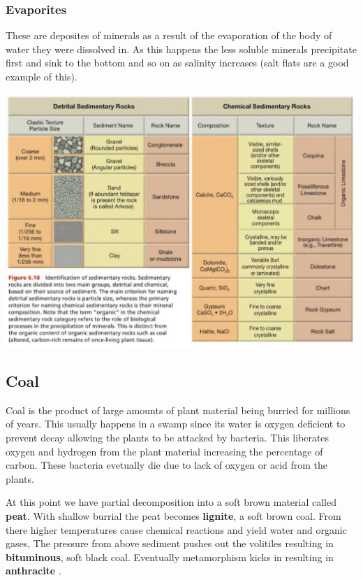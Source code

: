 \documentclass{article}
\begin{document}
\subsubsection{Evaporites} %
\label{sub:evaporites}
These are deposites of minerals as a result of the evaporation of the body of water they were dissolved in. As this happens the less soluble minerals precipitate first and sink to the bottom and so on as salinity increases (salt flats are a good example of this).

\includegraphics[width=7in]{sedimentary}

\subsection{Coal} %
\label{sub:coal}
Coal is the product of large amounts of plant material being burried for millions of years. This usually happens in a swamp since its water is oxygen deficient to prevent decay allowing the plants to be attacked by bacteria. This liberates oxygen and hydrogen from the plant material increasing the percentage of carbon. These bacteria evetually die due to lack of oxygen or acid from the plants.

At this point we have partial decomposition into a soft brown material called \textbf{peat}. With shallow burrial the peat becomes \textbf{lignite}, a soft brown coal. From there higher temperatures cause chemical reactions and yield water and organic gases, The pressure from above sediment pushes out the volitiles resulting in \textbf{bituminous}, soft black coal. Eventually metamorphism kicks in resulting in \textbf{anthracite} .
\end{document}
